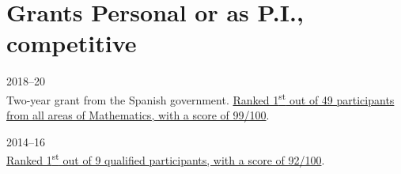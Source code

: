 \section*{Grants {\small Personal or as P.I., competitive}}

\begin{paracol}{2}
  \textsc{2018--20}
\switchcolumn
  \\
  Two-year grant from the Spanish government.
  \href{https://santini.in/files/cv/jdc17.pdf}{Ranked 1\textsuperscript{st} out of 49 participants from all areas of Mathematics, with a score of 99/100}.
\end{paracol}

\begin{paracol}{2}
  \textsc{2014--16}
\switchcolumn
  \\
  \href{https://santini.in/files/cv/phd14.pdf}{Ranked 1\textsuperscript{st} out of 9 qualified participants, with a score of 92/100}.
\end{paracol}